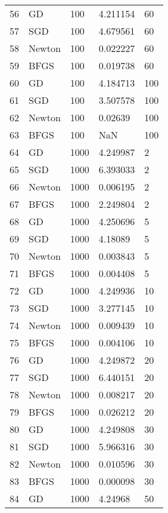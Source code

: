 \begin{tabular}{lllll}
56  &      GD &      100 &   4.211154 &     60 \\
57  &     SGD &      100 &   4.679561 &     60 \\
58  &  Newton &      100 &   0.022227 &     60 \\
59  &    BFGS &      100 &   0.019738 &     60 \\
60  &      GD &      100 &   4.184713 &    100 \\
61  &     SGD &      100 &   3.507578 &    100 \\
62  &  Newton &      100 &    0.02639 &    100 \\
63  &    BFGS &      100 &        NaN &    100 \\
64  &      GD &     1000 &   4.249987 &      2 \\
65  &     SGD &     1000 &   6.393033 &      2 \\
66  &  Newton &     1000 &   0.006195 &      2 \\
67  &    BFGS &     1000 &   2.249804 &      2 \\
68  &      GD &     1000 &   4.250696 &      5 \\
69  &     SGD &     1000 &    4.18089 &      5 \\
70  &  Newton &     1000 &   0.003843 &      5 \\
71  &    BFGS &     1000 &   0.004408 &      5 \\
72  &      GD &     1000 &   4.249936 &     10 \\
73  &     SGD &     1000 &   3.277145 &     10 \\
74  &  Newton &     1000 &   0.009439 &     10 \\
75  &    BFGS &     1000 &   0.004106 &     10 \\
76  &      GD &     1000 &   4.249872 &     20 \\
77  &     SGD &     1000 &   6.440151 &     20 \\
78  &  Newton &     1000 &   0.008217 &     20 \\
79  &    BFGS &     1000 &   0.026212 &     20 \\
80  &      GD &     1000 &   4.249808 &     30 \\
81  &     SGD &     1000 &   5.966316 &     30 \\
82  &  Newton &     1000 &   0.010596 &     30 \\
83  &    BFGS &     1000 &   0.000098 &     30 \\
84  &      GD &     1000 &    4.24968 &     50 \\

\end{tabular}
